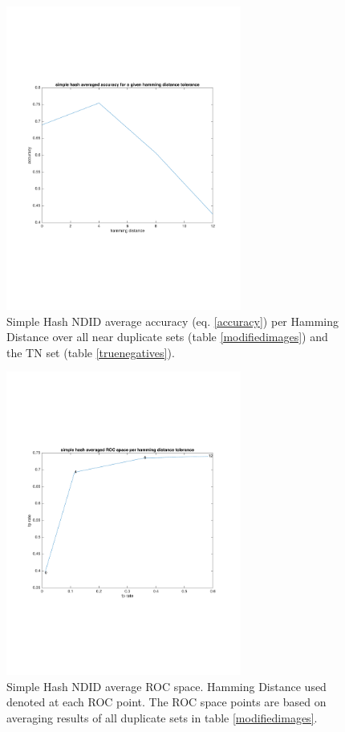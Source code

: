 \documentclass[english,12pt,a4paper,pdftex,elec,utf8]{aaltothesis}
\begin{document}
\begin{figure}[htb]
\begin{center}
\includegraphics[height=10cm]{figures/simpleTotalAccuracy}
\end{center}
\caption{Simple Hash NDID average accuracy (eq. \ref{accuracy}) per Hamming Distance over all near duplicate sets (table \ref{modifiedimages}) and the TN set (table \ref{truenegatives}).}
\label{simpletotalaccuracy}
\end{figure}

\begin{figure}[htb]
\begin{center}
\includegraphics[height=10cm]{figures/simpleTotalROC}
\end{center}
\caption{Simple Hash NDID average ROC space. Hamming Distance used denoted at each ROC point. The ROC space points are based on averaging results of all duplicate sets in table \ref{modifiedimages}. }
\label{simpletotalroc}
\end{figure}
\end{document}

